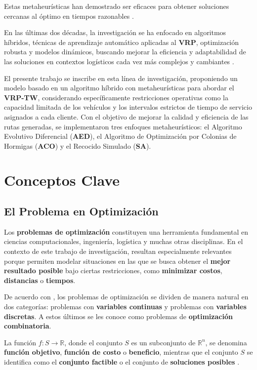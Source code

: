 \documentclass[12pt,titlepage,twoside,openright]{book}
\begin{document}
Estas metaheurísticas han demostrado ser eficaces para obtener soluciones cercanas al óptimo en tiempos razonables \citep{eksioglu2009}.

En las últimas dos décadas, la investigación se ha enfocado en algoritmos híbridos, técnicas de aprendizaje automático aplicadas al \textbf{VRP}, optimización robusta y modelos dinámicos, buscando mejorar la eficiencia y adaptabilidad de las soluciones en contextos logísticos cada vez más complejos y cambiantes \citep{toth2014}.

El presente trabajo se inscribe en esta línea de investigación, proponiendo un modelo basado en un algoritmo híbrido con metaheurísticas para abordar el \textbf{VRP-TW}, considerando específicamente restricciones operativas como la capacidad limitada de los vehículos y los intervalos estrictos de tiempo de servicio asignados a cada cliente. Con el objetivo de mejorar la calidad y eficiencia de las rutas generadas, se implementaron tres enfoques metaheurísticos: el Algoritmo Evolutivo Diferencial (\textbf{AED}), el Algoritmo de Optimización por Colonias de Hormigas (\textbf{ACO}) y el Recocido Simulado (\textbf{SA}).

\section{Conceptos Clave}

\subsection{El Problema en Optimización}

Los \textbf{problemas de optimización} constituyen una herramienta fundamental en ciencias computacionales, ingeniería, logística y muchas otras disciplinas. En el contexto de este trabajo de investigación, resultan especialmente relevantes porque permiten modelar situaciones en las que se busca obtener el \textbf{mejor resultado posible} bajo ciertas restricciones, como \textbf{minimizar costos}, \textbf{distancias} o \textbf{tiempos}.

De acuerdo con \citep{cobos2010}, los problemas de optimización se dividen de manera natural en dos categorías: problemas con \textbf{variables continuas} y problemas con \textbf{variables discretas}. A estos últimos se les conoce como problemas de \textbf{optimización combinatoria}.

La función \(f : S \to \mathbb{R}\), donde el conjunto \(S\) es un subconjunto de \(\mathbb{R}^n\), se denomina \textbf{función objetivo}, \textbf{función de costo} o \textbf{beneficio}, mientras que el conjunto \(S\) se identifica como el \textbf{conjunto factible} o el conjunto de \textbf{soluciones posibles} \citep{cobos2010}.
\end{document}
